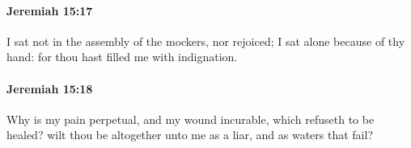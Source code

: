 		\paragraph{Jeremiah 15:17} %
			\label{JEREMIAH-15-17}

			I sat not in the assembly of the mockers, nor rejoiced; I sat alone because of thy hand: for thou hast filled me with indignation.


		\paragraph{Jeremiah 15:18} %
			\label{JEREMIAH-15-18}

			Why is my pain perpetual, and my wound incurable, which refuseth to be healed? wilt thou be altogether unto me as a liar, and as waters that fail?


